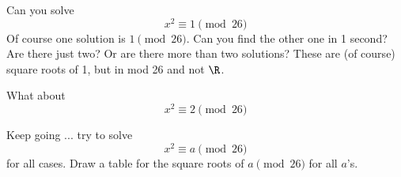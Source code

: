   \mbox{}
  \begin{myenum}
  \item
    Can you solve
    \[
      x^2 \equiv 1 \pmod{26}
    \]
    Of course one solution is $1 \pmod {26}$.
    Can you find the other one in 1 second?
    Are there just two? Or are there more than two solutions?
    These are (of course) square roots of 1, but in mod 26 and not $\R$.
  \item
    What about
    \[
      x^2 \equiv 2 \pmod{26}
    \]
  \item
    Keep going ... try to solve
    \[
      x^2 \equiv a \pmod{26}
    \]
    for all cases.
    Draw a table for the square roots of $a \pmod{26}$ for all $a$'s.
  \end{myenum}
